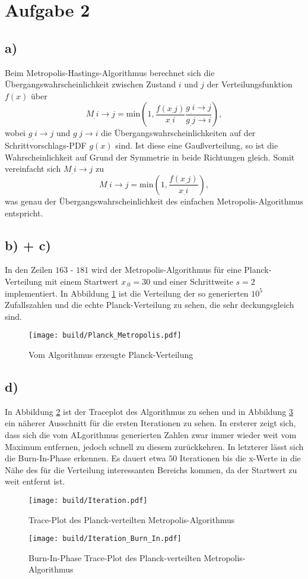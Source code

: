 \section{Aufgabe 2}
\label{sec:Aufgabe2}
\subsection*{a)}

Beim Metropolis-Hastings-Algorithmus berechnet sich die Übergangswahrscheinlichkeit zwischen Zustand $i$ und $j$ der Verteilungsfunktion $f(x)$ über 
\[
M_.{i\rightarrow j} = \mathrm{min}\left(1,\frac{f(x_.j)}{x_.i}\frac{g_.{i\rightarrow j}}{g_.{j\rightarrow i}}\right),
\]
wobei $g_.{i\rightarrow j}$ und $g_.{j\rightarrow i}$ die Übergangswahrscheinlichkeiten auf der Schrittvorschlags-PDF $g(x)$ sind.
Ist diese eine Gaußverteilung, so ist die Wahrscheinlichkeit auf Grund der Symmetrie in beide Richtungen gleich.
Somit vereinfacht sich $M_.{i\rightarrow j}$ zu
\[
M_.{i\rightarrow j} = \mathrm{min}\left(1,\frac{f(x_.j)}{x_.i}\right),
\]
was genau der Übergangswahrscheinlichkeit des einfachen Metropolis-Algorithmus entspricht.

\subsection*{b) + c)}
In den Zeilen $163$ - $181$ wird der Metropolis-Algorithmus für eine Planck-Verteilung mit einem Startwert $x_.0 = 30$ und einer Schrittweite $s = 2$ implementiert. In Abbildung \ref{fig:MetPla} ist die Verteilung der so generierten $10^5$ Zufallszahlen und die echte Planck-Verteilung zu sehen, die sehr deckungsgleich sind.

\begin{figure}
    \centering
    \texttt{[image: build/Planck\_Metropolis.pdf]}
    \caption{Vom Algorithmus erzeugte Planck-Verteilung}
    \label{fig:MetPla}
\end{figure}

\subsection*{d)}

In Abbildung \ref{fig:It} ist der Traceplot des Algorithmus zu sehen und in Abbildung \ref{fig:It2} ein näherer Ausschnitt für die ersten Iterationen zu sehen. In ersterer zeigt sich, dass sich die vom ALgorithmus generierten Zahlen zwar immer wieder weit vom Maximum entfernen, jedoch schnell zu diesem zurückkehren. In letzterer lässt sich die Burn-In-Phase erkennen. Es dauert etwa $50$ Iterationen bis die x-Werte in die Nähe des für die Verteilung interessanten Bereichs kommen, da der Startwert zu weit entfernt ist.

\begin{figure}
    \centering
    \texttt{[image: build/Iteration.pdf]}
    \caption{Trace-Plot des Planck-verteilten Metropolis-Algorithmus}
    \label{fig:It}
\end{figure}
\begin{figure}
    \centering
    \texttt{[image: build/Iteration\_Burn\_In.pdf]}
    \caption{Burn-In-Phase Trace-Plot des Planck-verteilten Metropolis-Algorithmus}
    \label{fig:It2}
\end{figure}